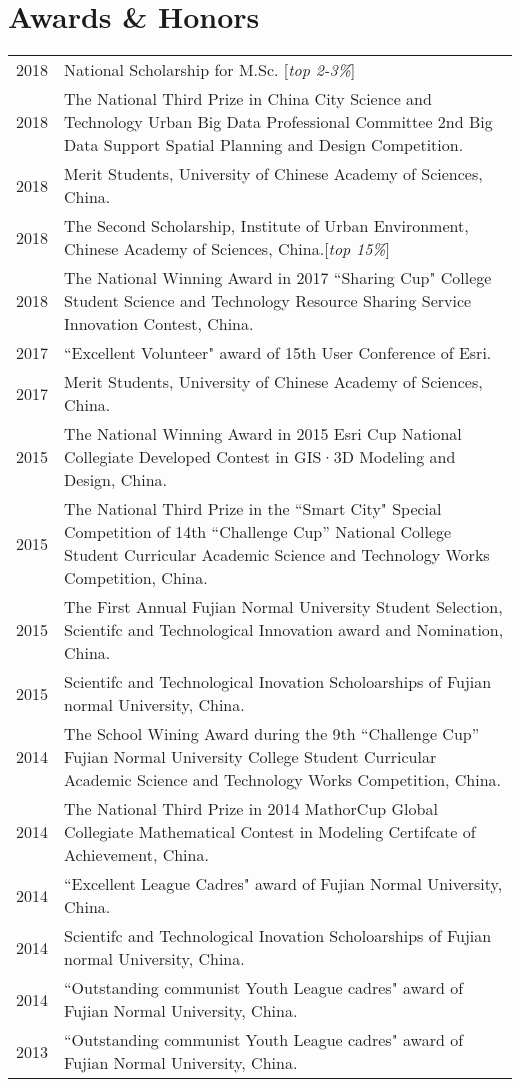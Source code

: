 \section*{Awards \& Honors}

\begin{tabular}{p{} p{}}
2018 & National Scholarship for M.Sc. [\textit{top 2-3\%}] \\
2018 & The National Third Prize in China City Science and Technology Urban Big Data Professional Committee 2nd Big Data Support Spatial Planning and Design Competition. \\
2018 & Merit Students, University of Chinese Academy of Sciences, China.\\
2018 & The Second Scholarship, Institute of Urban Environment, Chinese Academy of Sciences, China.[\textit{top 15\%}] \\
2018 & The National Winning Award in 2017 ``Sharing Cup" College Student Science and Technology Resource Sharing Service Innovation Contest, China.\\
2017 & ``Excellent Volunteer" award of 15th User Conference of Esri. \\
2017 & Merit Students, University of Chinese Academy of Sciences, China. \\
2015 & The National Winning Award in 2015 Esri Cup National Collegiate Developed Contest in GIS·3D Modeling and Design, China.\\
2015 & The National Third Prize in the ``Smart City" Special Competition of 14th “Challenge Cup” National College Student Curricular Academic Science and Technology Works Competition, China.\\
2015 & The First Annual Fujian Normal University Student Selection, Scientifc and Technological Innovation award and Nomination, China.\\
2015 & Scientifc and Technological Inovation Scholoarships of Fujian normal University, China.\\
2014 & The School Wining Award during the 9th “Challenge Cup” Fujian Normal University College Student Curricular Academic Science and Technology Works Competition, China.\\
2014 & The National Third Prize in 2014 MathorCup Global Collegiate Mathematical Contest in Modeling Certifcate of Achievement, China.\\
2014 & ``Excellent League Cadres" award of Fujian Normal University, China.\\
2014 & Scientifc and Technological Inovation Scholoarships of Fujian normal University, China.\\
2014 & ``Outstanding communist Youth League cadres" award of Fujian Normal University, China.\\
2013 & ``Outstanding communist Youth League cadres" award of Fujian Normal University, China.\\
\end{tabular}
